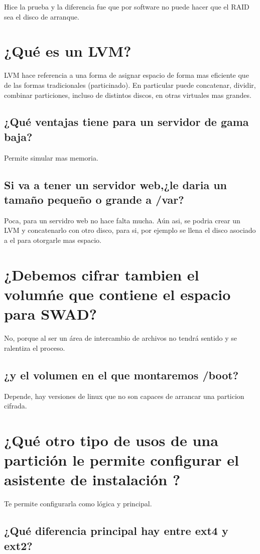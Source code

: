 Hice la prueba y la diferencia fue que por software no puede hacer que el RAID sea el disco de arranque.


\section{¿Qué es un LVM?}
LVM hace referencia a una forma de asignar espacio de forma mas eficiente que de las formas tradicionales (particinado). En particular puede concatenar, dividir, combinar particiones, incluso de distintos discos, en otras virtuales mas grandes.

\subsection{¿Qué ventajas tiene para un servidor de gama baja?}

Permite simular mas memoria.
\subsection{Si va a tener un servidor web,¿le daria un tamaño pequeño o grande a /var?}
Poca, para un servidro web no hace falta mucha. Aún asi, se podria crear un LVM y concatenarlo con otro disco, para si, por ejemplo se llena el disco asociado a el para otorgarle mas espacio.


\section{¿Debemos cifrar tambien el volumńe que contiene el espacio para SWAD?}

No, porque al ser un área de intercambio de archivos no tendrá sentido y se ralentiza el proceso.

\subsection{¿y el volumen en el que montaremos /boot?}

Depende, hay versiones de linux que no son capaces de arrancar una particion cifrada.

\section{¿Qué otro tipo de usos de una partición le permite configurar el asistente de instalación ?}

Te permite configurarla como lógica y principal.

\subsection{¿Qué diferencia principal hay entre ext4 y ext2?}

